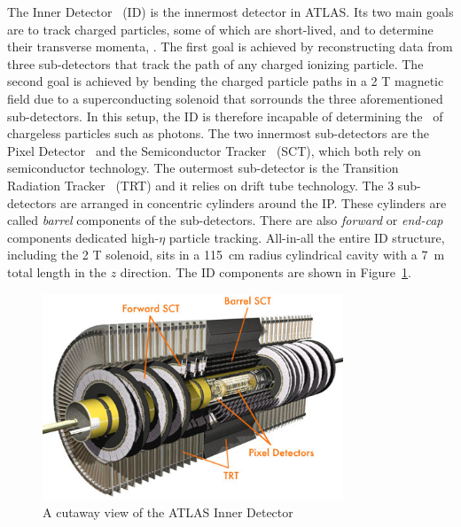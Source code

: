 \par The Inner Detector~\cite{IDET-2010-01} (ID) is the innermost detector in ATLAS. 
Its two main goals are to track charged particles, some of which are short-lived, 
and to determine their transverse momenta, \pT.
The first goal is achieved by reconstructing data from three sub-detectors that track 
the path of any charged ionizing particle.  
The second goal is achieved by bending the charged particle paths in a 2 T magnetic field 
due to a superconducting solenoid that sorrounds the three aforementioned sub-detectors.
In this setup, the ID is therefore incapable of determining the \pT\ of chargeless particles 
such as photons. The two innermost sub-detectors are 
 the Pixel Detector~\cite{1645094} and the Semiconductor Tracker~\cite{Aad:2014mta} (SCT), which both rely on 
semiconductor technology. The outermost sub-detector is the Transition 
Radiation Tracker~\cite{1748-0221-3-02-P02013} (TRT) and it relies on drift tube technology. 
The 3 sub-detectors are arranged in concentric cylinders around the IP. These cylinders 
are called {\it barrel} components of the sub-detectors. There are also {\it forward} or 
{\it end-cap} components dedicated high-$\eta$ particle tracking. All-in-all
the entire ID structure, including the 2 T solenoid, sits in a \SI{115}{\cm} radius 
cylindrical cavity with a \SI{7}{m} total length in the $z$ direction. The ID components are 
shown in Figure~\ref{fig:wholeID}. 

\begin{figure}
	\centering
   \includegraphics[width=0.8\textwidth]{figures/in_det_lab.jpg}
	\caption{A cutaway view of the ATLAS Inner Detector}
	\label{fig:wholeID}
\end{figure}

